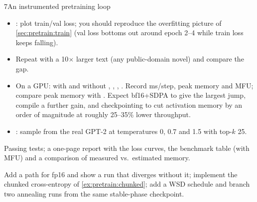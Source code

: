 \begin{labbox}{7}{An instrumented pretraining loop}
\begin{itemize}
\item {}: plot train/val loss;
  you should reproduce the overfitting picture of \cref{sec:pretrain:train} (val loss bottoms
  out around epoch 2--4 while train loss keeps falling).
\item Repeat with a 10$\times$ larger text (any public-domain novel) and compare the gap.
\item On a GPU:  with and without
  , , , . Record ms/step, peak
  memory and MFU; compare peak memory with . Expect bf16+SDPA
  to give the largest jump, compile a further gain, and checkpointing to cut activation memory
  by an order of magnitude at roughly 25--35\% lower throughput.
\item {}: sample from the real GPT-2 at temperatures
  0, 0.7 and 1.5 with top-$k$ 25.
\end{itemize}

Passing tests; a one-page report with the loss curves, the benchmark table (with MFU) and a
comparison of measured vs.\ estimated memory.

Add a  path for fp16 and show a run that diverges without it; implement the
chunked cross-entropy of \cref{ex:pretrain:chunked}; add a WSD schedule and
branch two annealing runs from the same stable-phase checkpoint.
\end{labbox}

